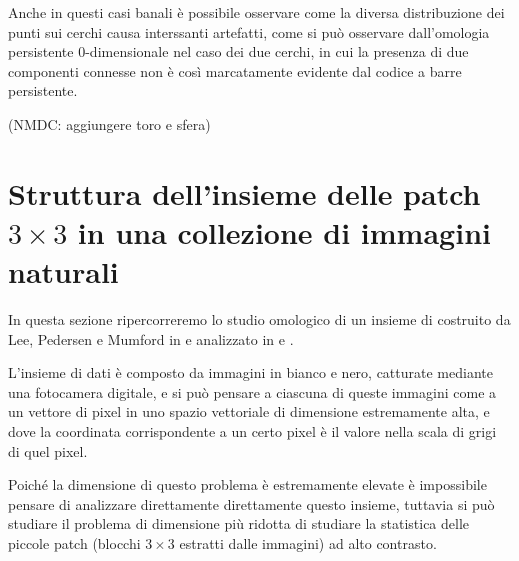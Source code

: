 Anche in questi casi banali è possibile osservare come la diversa distribuzione dei punti sui cerchi causa interssanti artefatti, come si può osservare dall'omologia persistente 0-dimensionale nel caso dei due cerchi, in cui la presenza di due componenti connesse non è così marcatamente evidente dal codice a barre persistente.

(NMDC: aggiungere toro e sfera)

\section{Struttura dell'insieme delle patch $3\times 3$ in una collezione di immagini naturali}

In questa sezione ripercorreremo lo studio omologico di un insieme di costruito da
Lee, Pedersen e Mumford in \cite{Lee2003} e analizzato in \cite{Carlsson2008} e \cite{DeSilva2004}.

L'insieme di dati è composto da immagini in bianco e nero, catturate mediante una fotocamera digitale, e si può pensare a ciascuna di queste immagini come a un vettore di pixel in uno spazio vettoriale di dimensione estremamente alta, e dove la coordinata corrispondente a un certo pixel è il valore nella scala di grigi di quel pixel.

Poiché la dimensione di questo problema è estremamente elevate è impossibile pensare di analizzare direttamente direttamente questo insieme, tuttavia si può studiare il problema di dimensione più ridotta di studiare la statistica delle piccole patch (blocchi $3\times 3$ estratti dalle immagini) ad alto contrasto.

